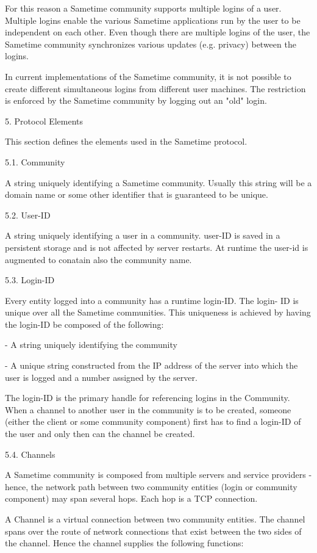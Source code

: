 \documentclass[titlepage,oneside]{book}
\begin{document}
For this reason a Sametime community supports multiple logins of a
user. Multiple logins enable the various Sametime applications run by
the user to be independent on each other. Even though there are
multiple logins of the user, the Sametime community synchronizes
various updates (e.g. privacy) between the logins.

In current implementations of the Sametime community, it is not
possible to create different simultaneous logins from different user
machines. The restriction is enforced by the Sametime community by
logging out an "old" login.

5. Protocol Elements

This section defines the elements used in the Sametime protocol.

5.1. Community

A string uniquely identifying a Sametime community. Usually this string
will be a domain name or some other identifier that is guaranteed to be
unique.

5.2. User-ID

A string uniquely identifying a user in a community. user-ID is saved
in a persistent storage and is not affected by server restarts. At
runtime the user-id is augmented to conatain also the community name.

5.3. Login-ID

Every entity logged into a community has a runtime login-ID. The login-
ID is unique over all the Sametime communities. This uniqueness is
achieved by having the login-ID be composed of the following:

- A string uniquely identifying the community

- A unique string constructed from the IP address of the server into
which the user is logged and a number assigned by the server.

The login-ID is the primary handle for referencing logins in the
Community. When a channel to another user in the community is to be
created, someone (either the client or some community component) first
has to find a login-ID of the user and only then can the channel be
created.

5.4. Channels

A Sametime community is composed from multiple servers and service
providers - hence, the network path between two community entities
(login or community component) may span several hops. Each hop is a TCP
connection.

A Channel is a virtual connection between two community entities. The
channel spans over the route of network connections that exist between
the two sides of the channel. Hence the channel supplies the following
functions:
\end{document}
